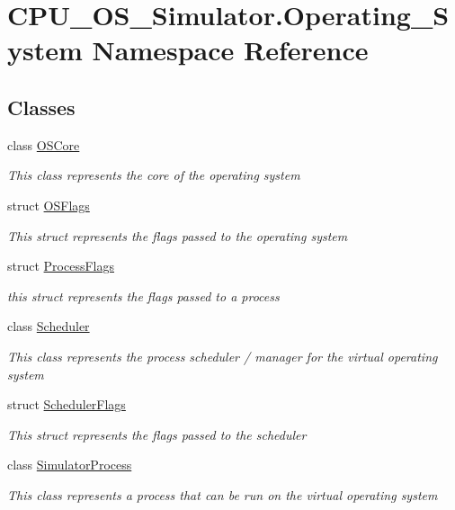 \hypertarget{namespace_c_p_u___o_s___simulator_1_1_operating___system}{}\section{C\+P\+U\+\_\+\+O\+S\+\_\+\+Simulator.\+Operating\+\_\+\+System Namespace Reference}
\label{namespace_c_p_u___o_s___simulator_1_1_operating___system}
\subsection*{Classes}
\begin{DoxyCompactItemize}
\item 
class \hyperlink{class_c_p_u___o_s___simulator_1_1_operating___system_1_1_o_s_core}{O\+S\+Core}
\begin{DoxyCompactList}\small\item\em This class represents the core of the operating system \end{DoxyCompactList}\item 
struct \hyperlink{struct_c_p_u___o_s___simulator_1_1_operating___system_1_1_o_s_flags}{O\+S\+Flags}
\begin{DoxyCompactList}\small\item\em This struct represents the flags passed to the operating system \end{DoxyCompactList}\item 
struct \hyperlink{struct_c_p_u___o_s___simulator_1_1_operating___system_1_1_process_flags}{Process\+Flags}
\begin{DoxyCompactList}\small\item\em this struct represents the flags passed to a process \end{DoxyCompactList}\item 
class \hyperlink{class_c_p_u___o_s___simulator_1_1_operating___system_1_1_scheduler}{Scheduler}
\begin{DoxyCompactList}\small\item\em This class represents the process scheduler / manager for the virtual operating system \end{DoxyCompactList}\item 
struct \hyperlink{struct_c_p_u___o_s___simulator_1_1_operating___system_1_1_scheduler_flags}{Scheduler\+Flags}
\begin{DoxyCompactList}\small\item\em This struct represents the flags passed to the scheduler \end{DoxyCompactList}\item 
class \hyperlink{class_c_p_u___o_s___simulator_1_1_operating___system_1_1_simulator_process}{Simulator\+Process}
\begin{DoxyCompactList}\small\item\em This class represents a process that can be run on the virtual operating system \end{DoxyCompactList}\end{DoxyCompactItemize}
